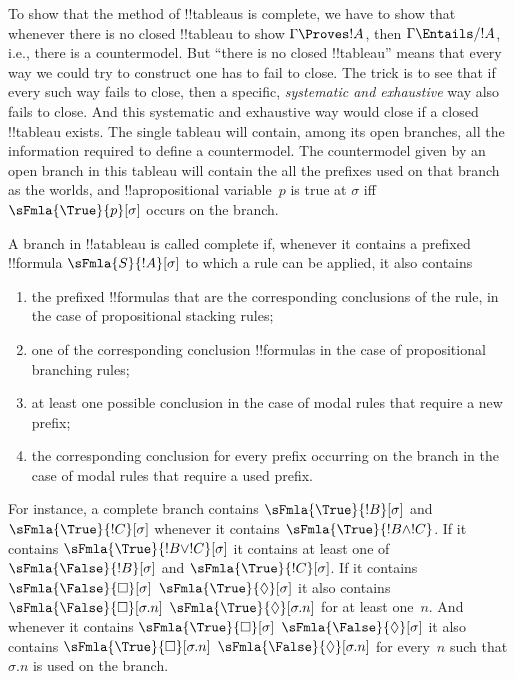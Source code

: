 \documentclass[../../../include/open-logic-section]{subfiles}
\begin{document}


\begin{explain}
  To show that the method of !!{tableau}s is complete, we have to show
  that whenever there is no closed !!{tableau} to show $\Gamma \Proves
  !A$, then $\Gamma \Entails/ !A$, i.e., there is a countermodel. But
  ``there is no closed !!{tableau}'' means that every way we could try
  to construct one has to fail to close. The trick is to see that if
  every such way fails to close, then a specific, \emph{systematic and
    exhaustive} way also fails to close. And this systematic and
  exhaustive way would close if a closed !!{tableau} exists. The
  single tableau will contain, among its open branches, all the
  information required to define a countermodel. The countermodel
  given by an open branch in this tableau will contain the all the
  prefixes used on that branch as the worlds, and !!a{propositional
    variable}~$p$ is true at $\sigma$ iff $\sFmla{\True}{p}[\sigma]$
  occurs on the branch.
\end{explain}

\begin{defn}
  A branch in !!a{tableau} is called complete if, whenever it contains
  a prefixed !!{formula} $\sFmla{S}{!A}[\sigma]$ to which a rule can
  be applied, it also contains
  \begin{enumerate}
    \item the prefixed !!{formula}s that are the corresponding
      conclusions of the rule, in the case of propositional stacking
      rules;
    \item one of the corresponding conclusion !!{formula}s in the case
      of propositional branching rules;
    \item at least one possible conclusion in the case of modal rules
      that require a new prefix;
    \item the corresponding conclusion for every prefix occurring on
      the branch in the case of modal rules that require a used
      prefix.
  \end{enumerate}
\end{defn}

\begin{explain}
For instance, a complete branch contains $\sFmla{\True}{!B}[\sigma]$
and $\sFmla{\True}{!C}[\sigma]$ whenever it contains $\sFmla{\True}{!B
  \land !C}$. If it contains $\sFmla{\True}{!B \lor !C}[\sigma]$ it
contains at least one of $\sFmla{\False}{!B}[\sigma]$ and
$\sFmla{\True}{!C}[\sigma]$. If it contains 
{$\sFmla{\False}{\Box}[\sigma]$} {$\sFmla{\True}{\Diamond}[\sigma]$}
it also contains  {$\sFmla{\False}{\Box}[\sigma.n]$}
{$\sFmla{\True}{\Diamond}[\sigma.n]$} for at least one~$n$.  And
whenever it contains  {$\sFmla{\True}{\Box}[\sigma]$}
{$\sFmla{\False}{\Diamond}[\sigma]$} it also contains 
{$\sFmla{\True}{\Box}[\sigma.n]$}
{$\sFmla{\False}{\Diamond}[\sigma.n]$} for every~$n$ such that
$\sigma.n$ is used on the branch.
\end{explain}
\end{document}
